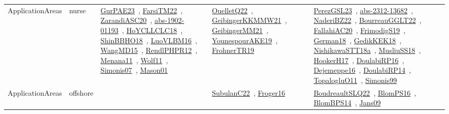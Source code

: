 {\begin{longtable}{lp{3cm}>{\raggedright\arraybackslash}p{6cm}>{\raggedright\arraybackslash}p{6cm}>{\raggedright\arraybackslash}p{8cm}}
ApplicationAreas & nurse & \href{works/GurPAE23.pdf}{GurPAE23}~\cite{GurPAE23}, \href{works/FarsiTM22.pdf}{FarsiTM22}~\cite{FarsiTM22}, \href{works/ZarandiASC20.pdf}{ZarandiASC20}~\cite{ZarandiASC20}, \href{works/abs-1902-01193.pdf}{abs-1902-01193}~\cite{abs-1902-01193}, \href{works/HoYCLLCLC18.pdf}{HoYCLLCLC18}~\cite{HoYCLLCLC18}, \href{works/ShinBBHO18.pdf}{ShinBBHO18}~\cite{ShinBBHO18}, \href{works/LuoVLBM16.pdf}{LuoVLBM16}~\cite{LuoVLBM16}, \href{works/WangMD15.pdf}{WangMD15}~\cite{WangMD15}, \href{works/RendlPHPR12.pdf}{RendlPHPR12}~\cite{RendlPHPR12}, \href{works/Menana11.pdf}{Menana11}~\cite{Menana11}, \href{works/Wolf11.pdf}{Wolf11}~\cite{Wolf11}, \href{works/Simonis07.pdf}{Simonis07}~\cite{Simonis07}, \href{works/Mason01.pdf}{Mason01}~\cite{Mason01} & \href{works/OuelletQ22.pdf}{OuelletQ22}~\cite{OuelletQ22}, \href{works/GeibingerKKMMW21.pdf}{GeibingerKKMMW21}~\cite{GeibingerKKMMW21}, \href{works/GeibingerMM21.pdf}{GeibingerMM21}~\cite{GeibingerMM21}, \href{works/YounespourAKE19.pdf}{YounespourAKE19}~\cite{YounespourAKE19}, \href{works/FrohnerTR19.pdf}{FrohnerTR19}~\cite{FrohnerTR19} & \href{works/PerezGSL23.pdf}{PerezGSL23}~\cite{PerezGSL23}, \href{works/abs-2312-13682.pdf}{abs-2312-13682}~\cite{abs-2312-13682}, \href{works/NaderiBZ22.pdf}{NaderiBZ22}~\cite{NaderiBZ22}, \href{works/BourreauGGLT22.pdf}{BourreauGGLT22}~\cite{BourreauGGLT22}, \href{works/FallahiAC20.pdf}{FallahiAC20}~\cite{FallahiAC20}, \href{works/FrimodigS19.pdf}{FrimodigS19}~\cite{FrimodigS19}, \href{works/German18.pdf}{German18}~\cite{German18}, \href{works/GedikKEK18.pdf}{GedikKEK18}~\cite{GedikKEK18}, \href{works/NishikawaSTT18a.pdf}{NishikawaSTT18a}~\cite{NishikawaSTT18a}, \href{works/MusliuSS18.pdf}{MusliuSS18}~\cite{MusliuSS18}, \href{works/HookerH17.pdf}{HookerH17}~\cite{HookerH17}, \href{works/DoulabiRP16.pdf}{DoulabiRP16}~\cite{DoulabiRP16}, \href{works/Dejemeppe16.pdf}{Dejemeppe16}~\cite{Dejemeppe16}, \href{works/DoulabiRP14.pdf}{DoulabiRP14}~\cite{DoulabiRP14}, \href{works/TopalogluO11.pdf}{TopalogluO11}~\cite{TopalogluO11}, \href{works/Simonis99.pdf}{Simonis99}~\cite{Simonis99}\\
ApplicationAreas & offshore &  & \href{works/SubulanC22.pdf}{SubulanC22}~\cite{SubulanC22}, \href{works/Froger16.pdf}{Froger16}~\cite{Froger16} & \href{works/BoudreaultSLQ22.pdf}{BoudreaultSLQ22}~\cite{BoudreaultSLQ22}, \href{works/BlomPS16.pdf}{BlomPS16}~\cite{BlomPS16}, \href{works/BlomBPS14.pdf}{BlomBPS14}~\cite{BlomBPS14}, \href{works/Jans09.pdf}{Jans09}~\cite{Jans09}\\

\end{longtable}}
